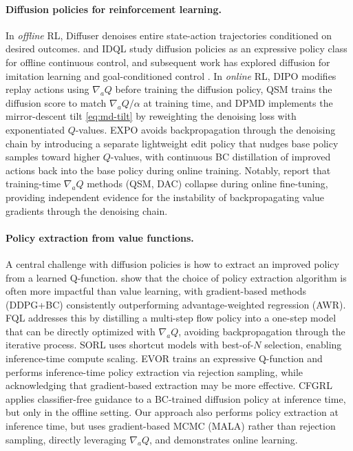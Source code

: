 \documentclass{article}
\theoremstyle{plain}
\theoremstyle{definition}
\theoremstyle{remark}
\begin{document}
\paragraph{Diffusion policies for reinforcement learning.}
In \emph{offline} RL, Diffuser \citep{janner2022diffuser} denoises entire state-action trajectories conditioned on desired outcomes.
\citet{wang2023diffusion} and IDQL \citep{hansen2023idql} study diffusion policies as an expressive policy class for offline continuous control, and subsequent work has explored diffusion for imitation learning and goal-conditioned control \citep{chi2023diffusion,reuss2023goal}.
In \emph{online} RL, DIPO \citep{yang2023dipo} modifies replay actions using $\nabla_a Q$ before training the diffusion policy, QSM \citep{psenka2024qsm} trains the diffusion score to match $\nabla_a Q / \alpha$ at training time, and DPMD \citep{ma2025soft} implements the mirror-descent tilt \cref{eq:md-tilt} by reweighting the denoising loss with exponentiated $Q$-values.
EXPO \citep{dong2025expo} avoids backpropagation through the denoising chain by introducing a separate lightweight edit policy that nudges base policy samples toward higher $Q$-values, with continuous BC distillation of improved actions back into the base policy during online training.
Notably, \citet{dong2025expo} report that training-time $\nabla_a Q$ methods (QSM, DAC) collapse during online fine-tuning, providing independent evidence for the instability of backpropagating value gradients through the denoising chain.

\paragraph{Policy extraction from value functions.}
A central challenge with diffusion policies is how to extract an improved policy from a learned Q-function.
\citet{park2024bottleneck} show that the choice of policy extraction algorithm is often more impactful than value learning, with gradient-based methods (DDPG+BC) consistently outperforming advantage-weighted regression (AWR).
FQL \citep{park2025fql} addresses this by distilling a multi-step flow policy into a one-step model that can be directly optimized with $\nabla_a Q$, avoiding backpropagation through the iterative process.
SORL \citep{espinosa2025sorl} uses shortcut models with best-of-$N$ selection, enabling inference-time compute scaling.
EVOR \citep{espinosa2025evor} trains an expressive Q-function and performs inference-time policy extraction via rejection sampling, while acknowledging that gradient-based extraction may be more effective.
CFGRL \citep{frans2025cfgrl} applies classifier-free guidance to a BC-trained diffusion policy at inference time, but only in the offline setting.
Our approach also performs policy extraction at inference time, but uses gradient-based MCMC (MALA) rather than rejection sampling, directly leveraging $\nabla_a Q$, and demonstrates online learning.
\end{document}
